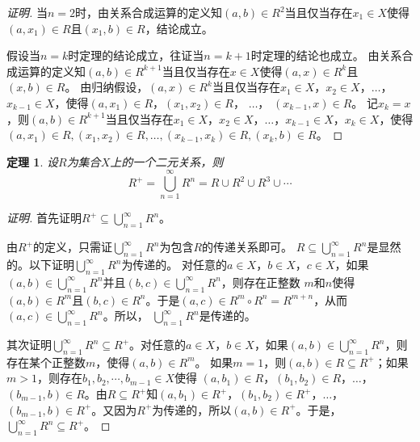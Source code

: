 \documentclass{book}[oneside]
\newtheorem{Thm}{定理}[chapter]
\begin{document}
\begin{CJK*}{UTF8}{gbsn}
\begin{proof}[证明]
  当$n=2$时，由关系合成运算的定义知$(a,b)\in R^2$当且仅当存在$x_1\in X$使得$(a,x_1)\in R$且$(x_1, b)\in R$，结论成立。

   假设当$n=k$时定理的结论成立，往证当$n=k+1$时定理的结论也成立。
   由关系合成运算的定义知$(a,b)\in R^{k+1}$当且仅当存在$x\in X$使得$(a,x)\in R^k$且$(x, b)\in R$。 由归纳假设，$(a,x)\in R^k$当且仅当存在$x_1\in X$，$x_2\in X$，$\ldots$，$x_{k-1}\in X$，使得$(a, x_1) \in R$，$(x_1, x_2)\in R$，  $\ldots$， $(x_{k-1}, x)\in R$。 记$x_{k}=x$，则$(a,b)\in R^{k+1}$当且仅当存在$x_1\in X$，$x_2\in X$，$\ldots$，$x_{k-1}\in X$，$x_{k}\in X$，使得$(a, x_1) \in R,(x_1, x_2)\in R,\ldots,(x_{k-1}, x_k)\in R,(x_k, b)\in R$。
\end{proof}
  \begin{Thm}
    设$R$为集合$X$上的一个二元关系，则
    \begin{equation*}
      R^+ = \bigcup_{n=1}^\infty R^n = R \cup R^2 \cup R^3 \cup \cdots 
    \end{equation*}
  \end{Thm}
  \begin{proof}[证明]
    首先证明$ R^+ \subseteq \bigcup_{n=1}^\infty R^n$。

    由$R^+$的定义，只需证$\bigcup_{n=1}^\infty R^n$为包含$R$的传递关系即可。
    $R\subseteq \bigcup_{n=1}^\infty R^n$是显然的。以下证明$\bigcup_{n=1}^\infty R^n$为传递的。
    对任意的$a\in X$，$b\in X$，$c\in X$，如果$(a,b)\in \bigcup_{n=1}^\infty R^n$并且$(b,c)\in \bigcup_{n=1}^\infty R^n$，则存在正整数
    $m$和$n$使得$(a,b)\in R^m$且$(b,c)\in R^n$。于是$(a,c)\in R^m\circ R^n = R^{m+n}$，从而$(a,c)\in \bigcup_{n=1}^\infty R^n$。所以，
    $\bigcup_{n=1}^\infty R^n$是传递的。

    其次证明$  \bigcup_{n=1}^\infty R^n\subseteq R^+$。对任意的$a\in X$，$b\in X$，如果$(a,b)\in \bigcup_{n=1}^\infty R^n$，则存在某个正整数$m$，使得$(a,b)\in R^m$。
    如果$m=1$，则$(a,b)\in R\subseteq R^+$；如果$m>1$，则存在$b_1,b_2,\cdots, b_{m-1}\in X$使得
    $(a,b_1)\in R$，$(b_1,b_2)\in R$，$\ldots$，$(b_{m-1},b)\in R$。由$R\subseteq R^+$知$(a,b_1)\in R^+$，$(b_1,b_2)\in R^+$，$\ldots$，$(b_{m-1},b)\in R^+$。又因为$R^+$为传递的，所以$(a,b)\in R^+$。于是，$ \bigcup_{n=1}^\infty R^n\subseteq R^+$。


\end{proof}
\end{CJK*}
\end{document}

